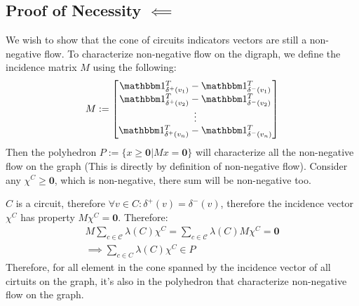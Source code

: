 \documentclass[]{article}
\theoremstyle{definition}
\begin{document}
    \subsection{Proof of Necessity $\impliedby$}
        We wish to show that the cone of circuits indicators vectors are still a non-negative flow. To characterize non-negative flow on the digraph, we define the incidence matrix $M$ using the following: 
        \begin{align}
            M := \begin{bmatrix}
                \mathbbm 1_{\delta^+(v_1)}^T - \mathbbm 1_{\delta^{-}(v_1)}^T
                \\
                \mathbbm 1_{\delta^+(v_2)}^T - \mathbbm 1_{\delta^{-}(v_2)}^T
                \\
                \vdots 
                \\
                \mathbbm 1_{\delta^+(v_n)}^T - \mathbbm 1_{\delta^{-}(v_n)}^T
            \end{bmatrix}
        \end{align}
        Then the polyhedron $P:=\{x\ge \mathbf 0 | Mx = \mathbf 0\}$ will characterize all the non-negative flow on the graph (This is directly by definition of non-negative flow). Consider any $\chi^C \ge \mathbf 0$, which is non-negative, there sum will be non-negative too. 
        \par
        $C$ is a circuit, therefore $\forall v \in C: \delta^+(v) = \delta^-(v)$, therefore the incidence vector $\chi^C$ has property $M\chi^C = \mathbf 0$. Therefore: 
        \begin{align}
            M \sum_{c \in \mathcal C}^{} \lambda(C)\chi^C = 
            \sum_{c \in \mathcal C}^{} \lambda(C)M\chi^C = \mathbf 0
            \\
            \implies \sum_{c\in C}^{}\lambda(C)\chi^C \in P
        \end{align}
        Therefore, for all element in the cone spanned by the incidence vector of all cirtuits on the graph, it's also in the polyhedron that characterize non-negative flow on the graph. 
\end{document}
